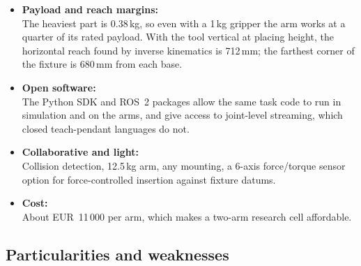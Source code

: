\documentclass[11pt,a4paper]{article}
\begin{document}
\begin{itemize}
  \item \textbf{Payload and reach margins:}\\ The heaviest part is 0.38\,kg, so even with a 1\,kg
        gripper the arm works at a quarter of its rated payload. With the tool vertical at
        placing height, the horizontal reach found by inverse kinematics is 712\,mm; the farthest
        corner of the fixture is 680\,mm from each base.
  \item \textbf{Open software:}\\ The Python SDK and ROS~2 packages allow the same task code to run
        in simulation and on the arms, and give access to joint-level streaming, which closed
        teach-pendant languages do not.
  \item \textbf{Collaborative and light:}\\ Collision detection, 12.5\,kg arm, any mounting, a
        6-axis force/torque sensor option for force-controlled insertion against fixture datums.
  \item \textbf{Cost:}\\ About EUR~11\,000 per arm, which makes a two-arm research cell affordable.
\end{itemize}

\subsection{Particularities and weaknesses}
\end{document}
